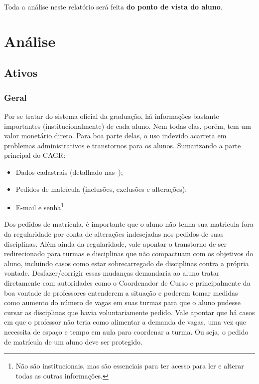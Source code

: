 \documentclass{article}
\begin{document}
    Toda a análise neste relatório será feita \textbf{do ponto de vista do
    aluno}.

    \section{Análise}

    \subsection{Ativos}

    \subsubsection{Geral}

    Por se tratar do sistema oficial da graduação, há informações bastante
    importantes (institucionalmente) de cada aluno. Nem todas elas, porém, tem
    um valor monetário direto. Para boa parte delas, o uso indevido acarreta em
    problemas administrativos e transtornos para os alunos. Sumarizando a parte
    principal do CAGR\@:

    \begin{itemize}
        \item Dados cadastrais (detalhado
            nas~);
        \item Pedidos de matrícula (inclusões, exclusões e alterações);
        \item E-mail e senha\footnote{Não são institucionais, mas são
            essenciais para ter acesso para ler e alterar todas as outras
            informações.}
    \end{itemize}

    Dos pedidos de matrícula, é importante que o aluno não tenha sua matricula
    fora da regularidade por conta de alterações indesejadas nos pedidos de
    suas disciplinas. Além ainda da regularidade, vale apontar o transtorno de
    ser redirecionado para turmas e disciplinas que não compactuam com os
    objetivos do aluno, incluindo casos como estar sobrecarregado de
    disciplinas contra a própria vontade. Desfazer/corrigir essas mudanças
    demandaria ao aluno tratar diretamente com autoridades como o Coordenador
    de Curso e principalmente da boa vontade de professores entenderem a
    situação e poderem tomar medidas como aumento do número de vagas em suas
    turmas para que o aluno pudesse cursar as disciplinas que havia
    voluntariamente pedido. Vale apontar que há casos em que o professor não
    teria como alimentar a demanda de vagas, uma vez que necessita de espaço e
    tempo em aula para coordenar a turma. Ou seja, o pedido de matrícula de um
    aluno deve ser protegido.
\end{document}
